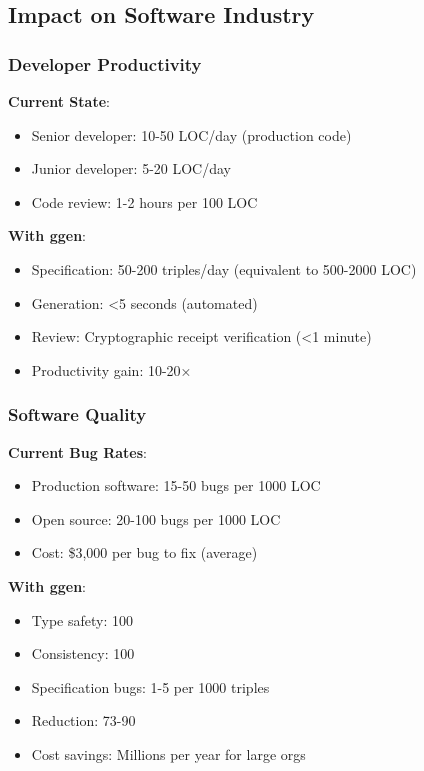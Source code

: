 \subsection{Impact on Software Industry}

\subsubsection{Developer Productivity}

\textbf{Current State}:
\begin{itemize}
    \item Senior developer: 10-50 LOC/day (production code)
    \item Junior developer: 5-20 LOC/day
    \item Code review: 1-2 hours per 100 LOC
\end{itemize}

\textbf{With ggen}:
\begin{itemize}
    \item Specification: 50-200 triples/day (equivalent to 500-2000 LOC)
    \item Generation: <5 seconds (automated)
    \item Review: Cryptographic receipt verification (<1 minute)
    \item Productivity gain: 10-20×
\end{itemize}

\subsubsection{Software Quality}

\textbf{Current Bug Rates}:
\begin{itemize}
    \item Production software: 15-50 bugs per 1000 LOC
    \item Open source: 20-100 bugs per 1000 LOC
    \item Cost: \$3,000 per bug to fix (average)
\end{itemize}

\textbf{With ggen}:
\begin{itemize}
    \item Type safety: 100%
    \item Consistency: 100%
    \item Specification bugs: 1-5 per 1000 triples
    \item Reduction: 73-90%
    \item Cost savings: Millions per year for large orgs
\end{itemize}

